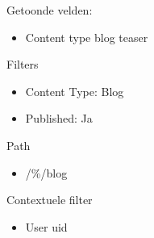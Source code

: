 Getoonde velden: 
\begin{itemize}
\item Content type blog teaser
\end{itemize}

Filters
\begin{itemize}
\item Content Type: Blog
\item Published: Ja
\end{itemize}

Path
\begin{itemize}
\item /\%/blog
\end{itemize}

Contextuele filter
\begin{itemize}
\item User uid
\end{itemize}